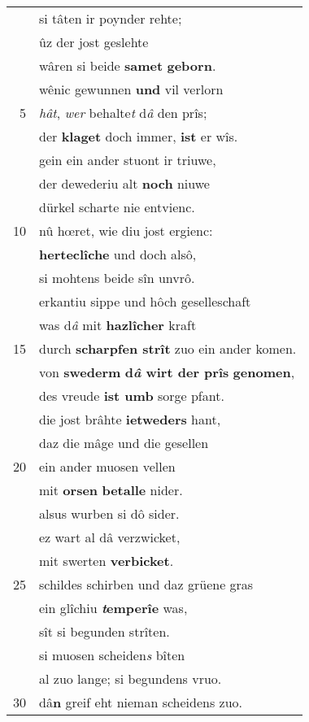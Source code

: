 \documentclass[8pt,a4paper,notitlepage]{article}
\begin{document}
\begin{table}[ht]
\begin{minipage}[t]{0.5\linewidth}
\begin{tabular}{rl}
 & si tâten ir poynder rehte;\\ 
 & ûz der jost geslehte\\ 
 & wâren si beide \textbf{samet} \textbf{geborn}.\\ 
 & wênic gewunnen \textbf{und} vil verlorn\\ 
5 & \textit{hât}, \textit{wer} behalte\textit{t} d\textit{â} den prîs;\\ 
 & der \textbf{klaget} doch immer, \textbf{ist} er wîs.\\ 
 & gein ein ander stuont ir triuwe,\\ 
 & der dewederiu alt \textbf{noch} niuwe\\ 
 & dürkel scharte nie entvienc.\\ 
10 & nû hœret, wie diu jost ergienc:\\ 
 & \textbf{herteclîche} und doch alsô,\\ 
 & si mohtens beide sîn unvrô.\\ 
 & erkantiu sippe und hôch geselleschaft\\ 
 & was d\textit{â} mit \textbf{hazlîcher} kraft\\ 
15 & durch \textbf{scharpfen strît} zuo ein ander komen.\\ 
 & von \textbf{swederm} \textbf{d\textit{â} wirt der prîs} \textbf{genomen},\\ 
 & des vreude \textbf{ist umb} sorge pfant.\\ 
 & die jost brâhte \textbf{ietweders} hant,\\ 
 & daz die mâge und die gesellen\\ 
20 & ein ander muosen vellen\\ 
 & mit \textbf{orsen} \textbf{betalle} nider.\\ 
 & alsus wurben si dô sider.\\ 
 & ez wart al dâ verzwicket,\\ 
 & mit swerten \textbf{verbicket}.\\ 
25 & schildes schirben und daz grüene gras\\ 
 & ein glîchiu \textbf{\textit{t}emperîe} was,\\ 
 & sît si begunden strîten.\\ 
 & si muosen scheiden\textit{s} bîten\\ 
 & al zuo lange; si begundens vruo.\\ 
30 & dâ\textbf{n} greif eht nieman scheidens zuo.\\ 
\end{tabular}
\scriptsize

\end{minipage}
\end{table}
\end{document}
